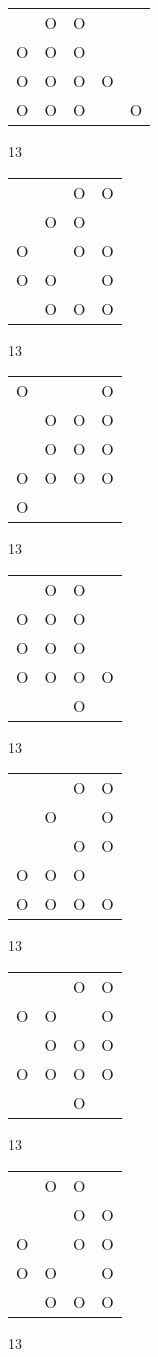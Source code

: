 \begin{tabular}{|m{0.2cm}m{0.2cm}m{0.2cm}m{0.2cm}m{0.2cm}|}\hline
 &O&O& & \\
O&O&O& & \\
O&O&O&O& \\
O&O&O& &O\\
\hline\end{tabular}13
\begin{tabular}{|m{0.2cm}m{0.2cm}m{0.2cm}m{0.2cm}|}\hline
 & &O&O\\
 &O&O& \\
O& &O&O\\
O&O& &O\\
 &O&O&O\\
\hline\end{tabular}13
\begin{tabular}{|m{0.2cm}m{0.2cm}m{0.2cm}m{0.2cm}|}\hline
O& & &O\\
 &O&O&O\\
 &O&O&O\\
O&O&O&O\\
O& & & \\
\hline\end{tabular}13
\begin{tabular}{|m{0.2cm}m{0.2cm}m{0.2cm}m{0.2cm}|}\hline
 &O&O& \\
O&O&O& \\
O&O&O& \\
O&O&O&O\\
 & &O& \\
\hline\end{tabular}13
\begin{tabular}{|m{0.2cm}m{0.2cm}m{0.2cm}m{0.2cm}|}\hline
 & &O&O\\
 &O& &O\\
 & &O&O\\
O&O&O& \\
O&O&O&O\\
\hline\end{tabular}13
\begin{tabular}{|m{0.2cm}m{0.2cm}m{0.2cm}m{0.2cm}|}\hline
 & &O&O\\
O&O& &O\\
 &O&O&O\\
O&O&O&O\\
 & &O& \\
\hline\end{tabular}13
\begin{tabular}{|m{0.2cm}m{0.2cm}m{0.2cm}m{0.2cm}|}\hline
 &O&O& \\
 & &O&O\\
O& &O&O\\
O&O& &O\\
 &O&O&O\\
\hline\end{tabular}13
